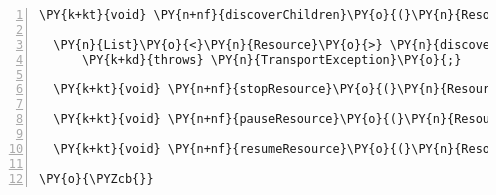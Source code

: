 \begin{Verbatim}[commandchars=\\\{\},numbers=left,firstnumber=1,stepnumber=1]
  \PY{k+kt}{void} \PY{n+nf}{discoverChildren}\PY{o}{(}\PY{n}{Resource} \PY{n}{resource}\PY{o}{,} \PY{n}{List}\PY{o}{<}\PY{n}{String}\PY{o}{>} \PY{n}{types}\PY{o}{)} \PY{k+kd}{throws} \PY{n}{TransportException}\PY{o}{;}

  \PY{n}{List}\PY{o}{<}\PY{n}{Resource}\PY{o}{>} \PY{n}{discoverDirectChildren}\PY{o}{(}\PY{n}{Resource} \PY{n}{resource}\PY{o}{,} \PY{n}{String} \PY{n}{type}\PY{o}{)} 
	  \PY{k+kd}{throws} \PY{n}{TransportException}\PY{o}{;}

  \PY{k+kt}{void} \PY{n+nf}{stopResource}\PY{o}{(}\PY{n}{Resource} \PY{n}{resource}\PY{o}{)} \PY{k+kd}{throws} \PY{n}{TransportException}\PY{o}{;}

  \PY{k+kt}{void} \PY{n+nf}{pauseResource}\PY{o}{(}\PY{n}{Resource} \PY{n}{resource}\PY{o}{)} \PY{k+kd}{throws} \PY{n}{TransportException}\PY{o}{;}

  \PY{k+kt}{void} \PY{n+nf}{resumeResource}\PY{o}{(}\PY{n}{Resource} \PY{n}{resource}\PY{o}{)} \PY{k+kd}{throws} \PY{n}{TransportException}\PY{o}{;}

\PY{o}{\PYZcb{}}
\end{Verbatim}
